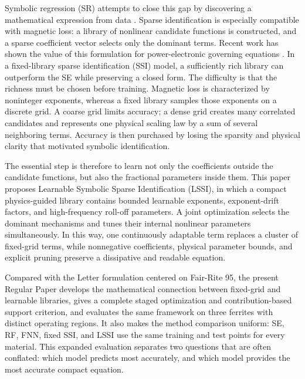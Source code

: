 \documentclass[lettersize,journal]{IEEEtran}
\begin{document}
Symbolic regression (SR) attempts to close this gap by discovering a mathematical expression from data \cite{9180100}. Sparse identification is especially compatible with magnetic loss: a library of nonlinear candidate functions is constructed, and a sparse coefficient vector selects only the dominant terms. Recent work has shown the value of this formulation for power-electronic governing equations \cite{11106929,11592694}. In a fixed-library sparse identification (SSI) model, a sufficiently rich library can outperform the SE while preserving a closed form. The difficulty is that the richness must be chosen before training. Magnetic loss is characterized by noninteger exponents, whereas a fixed library samples those exponents on a discrete grid. A coarse grid limits accuracy; a dense grid creates many correlated candidates and represents one physical scaling law by a sum of several neighboring terms. Accuracy is then purchased by losing the sparsity and physical clarity that motivated symbolic identification.

The essential step is therefore to learn not only the coefficients outside the candidate functions, but also the fractional parameters inside them. This paper proposes Learnable Symbolic Sparse Identification (LSSI), in which a compact physics-guided library contains bounded learnable exponents, exponent-drift factors, and high-frequency roll-off parameters. A joint optimization selects the dominant mechanisms and tunes their internal nonlinear parameters simultaneously. In this way, one continuously adaptable term replaces a cluster of fixed-grid terms, while nonnegative coefficients, physical parameter bounds, and explicit pruning preserve a dissipative and readable equation.

Compared with the Letter formulation centered on Fair-Rite 95, the present Regular Paper develops the mathematical connection between fixed-grid and learnable libraries, gives a complete staged optimization and contribution-based support criterion, and evaluates the same framework on three ferrites with distinct operating regions. It also makes the method comparison uniform: SE, RF, FNN, fixed SSI, and LSSI use the same training and test points for every material. This expanded evaluation separates two questions that are often conflated: which model predicts most accurately, and which model provides the most accurate compact equation.
\end{document}
